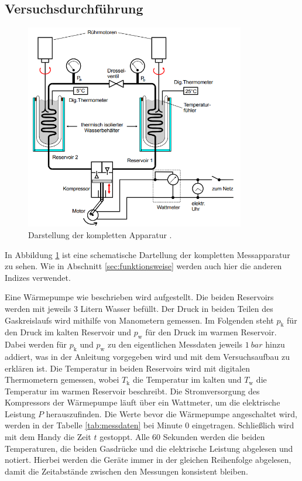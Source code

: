 \subsection{Versuchsdurchführung}
\begin{figure}[H]
    \centering
    \includegraphics[height = 9cm]{kompletteApparatur.png}
    \caption{Darstellung der kompletten Apparatur \cite[]{man:v206}.}
    \label{fig:kompletteDarstellung}
\end{figure}
\noindent
In Abbildung \ref{fig:kompletteDarstellung} ist eine schematische Dartellung der kompletten Messapparatur zu sehen.
Wie in Abschnitt \ref{sec:funktionsweise} werden auch hier die anderen Indizes verwendet.

\noindent 
Eine Wärmepumpe wie beschrieben wird aufgestellt.
Die beiden Reservoirs werden mit jeweils 3 Litern Wasser befüllt.
Der Druck in beiden Teilen des Gaskreislaufs wird mithilfe von Manometern gemessen.
Im Folgenden steht $p_\text{k}$ für den Druck im kalten Reservoir und $p_\text{w}$ für den Druck im warmen Reservoir.
Dabei werden für $p_\text{k}$ und $p_\text{w}$ zu den eigentlichen Messdaten jeweils $\qty[]{1}{bar}$ hinzu addiert,
was in der Anleitung \cite[]{man:v206} vorgegeben wird und mit dem Versuchsaufbau zu erklären ist. 
Die Temperatur in beiden Reservoirs wird mit digitalen Thermometern gemessen,
wobei $T_\text{k}$ die Temperatur im kalten und $T_\text{w}$ die Temperatur im warmen Reservoir beschreibt.
Die Stromversorgung des Kompressors der Wärmepumpe läuft über ein Wattmeter, um die elektrische Leistung $P$ herauszufinden.
Die Werte bevor die Wärmepumpe angeschaltet wird, werden in der Tabelle \ref{tab:messdaten} bei Minute 0 eingetragen.
Schließlich wird mit dem Handy die Zeit $t$ gestoppt.
Alle 60 Sekunden werden die beiden Temperaturen, die beiden Gasdrücke und die elektrische Leistung abgelesen und notiert.
Hierbei werden die Geräte immer in der gleichen Reihenfolge abgelesen, 
damit die Zeitabstände zwischen den Messungen konsistent bleiben.

